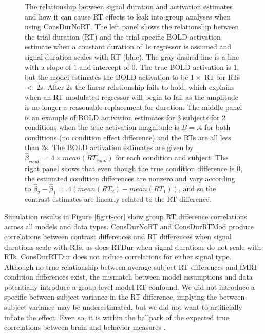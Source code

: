 \documentclass[sn-mathphys,Numbered, super, referee, lineno]{sn-jnl}
\begin{document}
\begin{figure}[ht!]
  \centering
   \caption{The relationship between signal duration and activation estimates and how it can cause RT effects to leak into group analyses when using ConsDurNoRT.  The left panel shows the relationship between the trial duration (RT) and the trial-specific BOLD activation estimate when a constant duration of 1s regressor is assumed and signal duration scales with RT (blue).  The gray dashed line is a line with a slope of 1 and intercept of 0.  The true BOLD activation is 1, but the model estimates the BOLD activation to be $1\times$ RT for RTs $<$ 2s.  After 2s the linear relationship fails to hold, which explains when an RT modulated regressor will begin to fail as the amplitude is no longer a reasonable replacement for duration.  The middle panel is an example of BOLD activation estimates for 3 subjects for 2 conditions when the true activation magnitude is $B=.4$ for both conditions (no condition effect difference) and the RTs are all less than 2s. The BOLD activation estimates are given by $\hat\beta_{cond} = .4 \times mean(RT_{cond})$ for each condition and subject.  The right panel shows that even though the true condition difference is 0, the estimated condition differences are nonzero and vary according to $\hat\beta_2 - \hat\beta_1 = .4 (mean(RT_2) - mean(RT_1))$, and so the contrast estimates are linearly related to the RT difference.}
  \label{fig:bold_rt}
\end{figure}


Simulation results in Figure \ref{fig:rt-cor} show  group RT difference correlations across all models and data types. ConsDurNoRT and ConsDurRTMod   produce correlations between contrast differences and RT differences when signal durations scale with RTs, as does RTDur when signal durations do not scale with RTs. ConsDurRTDur does not induce correlations for either signal type.  Although no true relationship between average subject RT differences and fMRI condition differences exist, the mismatch between model assumptions and data potentially introduce a group-level model RT confound.  We did not introduce a specific between-subject variance in the RT difference, implying the between-subject variance may be underestimated, but we did not want to artificially inflate the effect.  Even so, it is within the ballpark of the expected true correlations between brain and behavior measures \citep{marekReproducibleBrainwideAssociation2022}.  
\end{document}
